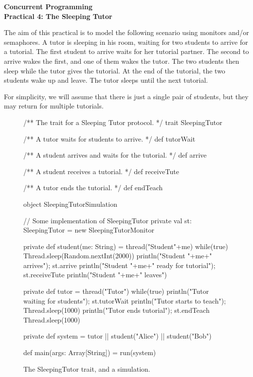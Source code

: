 \documentclass[12pt,a4paper]{article}
\begin{document}
\begin{center}
\LARGE\bf Concurrent Programming \\
Practical 4: The Sleeping Tutor
\end{center}

The aim of this practical is to model the following scenario using monitors
and/or semaphores.
A tutor is sleeping in his room, waiting for two students to arrive for a
tutorial.  The first student to arrive waits for her tutorial partner.  The
second to arrive wakes the first, and one of them wakes the tutor.  The two
students then sleep while the tutor gives the tutorial.  At the end of the
tutorial, the two students wake up and leave.  The tutor sleeps until the next
tutorial. 

For simplicity, we will assume that there is just a single pair of students,
but they may return for multiple tutorials.


\begin{figure}
\begin{scala}
/** The trait for a Sleeping Tutor protocol. */
trait SleepingTutor{
  /** A tutor waits for students to arrive. */
  def tutorWait

  /** A student arrives and waits for the tutorial. */
  def arrive
  
  /** A student receives a tutorial. */
  def receiveTute

  /** A tutor ends the tutorial. */
  def endTeach
}

object SleepingTutorSimulation{ 
  // Some implementation of SleepingTutor
  private val st: SleepingTutor = new SleepingTutorMonitor

  private def student(me: String) = thread("Student"+me){
    while(true){
      Thread.sleep(Random.nextInt(2000))
      println("Student "+me+" arrives"); st.arrive
      println("Student "+me+" ready for tutorial"); st.receiveTute
      println("Student "+me+" leaves")
    }
  }

  private def tutor = thread("Tutor"){
    while(true){
      println("Tutor waiting for students"); st.tutorWait
      println("Tutor starts to teach"); Thread.sleep(1000)
      println("Tutor ends tutorial"); st.endTeach
      Thread.sleep(1000)
    }
  }

  private def system = tutor || student("Alice") || student("Bob")

  def main(args: Array[String]) = run(system)
}
\end{scala}
\caption{The {\scalashape SleepingTutor} trait, and a simulation.}
\label{fig:1}
\end{figure}
\end{document}
